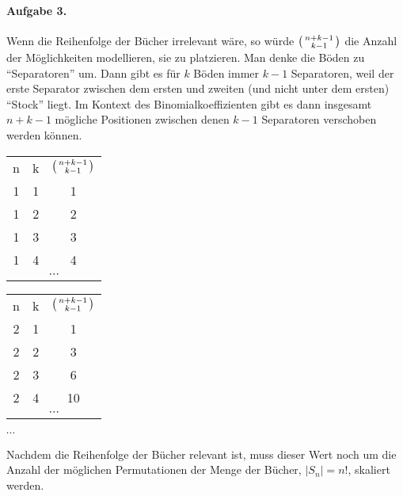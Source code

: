 \documentclass{article}
\begin{document}
\paragraph{Aufgabe 3.}

Wenn die Reihenfolge der B\"ucher irrelevant w\"are, so w\"urde $\begin{psmallmatrix}n + k - 1 \\ k - 1\end{psmallmatrix}$ die Anzahl der M\"oglich\-kei\-ten modellieren, sie zu platzieren. Man denke die B\"oden zu \enquote{Separatoren} um. Dann gibt es f\"ur $k$ B\"oden immer $k - 1$ Separatoren, weil der erste Separator zwischen dem ersten und zweiten (und nicht unter dem ersten) \enquote{Stock} liegt. Im Kontext des Binomialkoeffizienten gibt es dann insgesamt $n + k - 1$ m\"ogliche Positionen zwischen denen $k - 1$ Separatoren verschoben werden k\"onnen.

\begin{center}
    \begin{tabular}{c c c}
        n & k & $\begin{psmallmatrix}n + k - 1 \\ k - 1\end{psmallmatrix}$ \\
        1 & 1 & 1 \\
        1 & 2 & 2 \\
        1 & 3 & 3 \\
        1 & 4 & 4 \\
        \multicolumn{3}{c}{$\cdots$}
    \end{tabular}
    \quad
    \begin{tabular}{c c c}
        n & k & $\begin{psmallmatrix}n + k - 1 \\ k - 1\end{psmallmatrix}$ \\
        2 & 1 & 1 \\
        2 & 2 & 3 \\
        2 & 3 & 6 \\
        2 & 4 & 10 \\
        \multicolumn{3}{c}{$\cdots$}
    \end{tabular}
    \quad
    $\cdots$
\end{center}

Nachdem die Reihenfolge der B\"ucher relevant ist, muss dieser Wert noch um die Anzahl der m\"oglichen Permutationen der Menge der B\"ucher, $|S_n| = n!$, skaliert werden.
\end{document}
